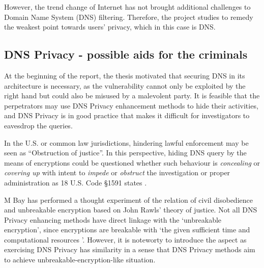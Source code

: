 However, the trend change of Internet has not brought additional challenges to Domain Name System (DNS) filtering. Therefore, the project studies to remedy the weakest point towards users' privacy, which in this case is DNS.

\subsection{DNS Privacy - possible aids for the criminals}
At the beginning of the report, the thesis motivated that securing DNS in its architecture is necessary, as the vulnerability cannot only be exploited by the right hand but could also be misused by a malevolent party.
It is feasible that the perpetrators may use DNS Privacy enhancement methods to hide their activities, and DNS Privacy is in good practice that makes it difficult for investigators to eavesdrop the queries.

In the U.S. or common law jurisdictions, hindering lawful enforcement may be seen as ``Obstruction of justice''.
In this perspective, hiding DNS query by the means of encryptions could be questioned whether such behaviour is \textit{concealing} or \textit{covering up} with intent to \textit{impede} or \textit{obstruct} the investigation or proper administration as 18 U.S. Code \S 1591 states \cite{Obstructionofjustice}.

M Bay has performed a thought experiment of the relation of civil disobedience and unbreakable encryption \cite{bay2017ethics} based on John Rawls' theory of justice.
Not all DNS Privacy enhancing methods have direct linkage with the `unbreakable encryption', since encryptions are breakable with `the given sufficient time and computational resources \cite{ellison2000ten,chau2006application}'.
However, it is noteworty to introduce the aspect as exercising DNS Privacy has similarity in a sense that DNS Privacy methods aim to achieve unbreakable-encryption-like situation.

